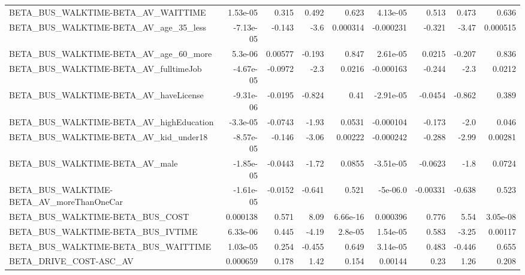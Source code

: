 \begin{tabular}{lrrrrrrrr}
BETA\_BUS\_WALKTIME-BETA\_AV\_WAITTIME                 &    1.53e-05 &        0.315 &    0.492 &    0.623 &   4.13e-05 &       0.513 &        0.473 &         0.636 \\
BETA\_BUS\_WALKTIME-BETA\_AV\_age\_35\_less              &   -7.13e-05 &       -0.143 &     -3.6 & 0.000314 &  -0.000231 &      -0.321 &        -3.47 &      0.000515 \\
BETA\_BUS\_WALKTIME-BETA\_AV\_age\_60\_more              &     5.3e-06 &      0.00577 &   -0.193 &    0.847 &   2.61e-05 &      0.0215 &       -0.207 &         0.836 \\
BETA\_BUS\_WALKTIME-BETA\_AV\_fulltimeJob              &   -4.67e-05 &      -0.0972 &     -2.3 &   0.0216 &  -0.000163 &      -0.244 &         -2.3 &        0.0212 \\
BETA\_BUS\_WALKTIME-BETA\_AV\_haveLicense              &   -9.31e-06 &      -0.0195 &   -0.824 &     0.41 &  -2.91e-05 &     -0.0454 &       -0.862 &         0.389 \\
BETA\_BUS\_WALKTIME-BETA\_AV\_highEducation            &    -3.3e-05 &      -0.0743 &    -1.93 &   0.0531 &  -0.000104 &      -0.173 &         -2.0 &         0.046 \\
BETA\_BUS\_WALKTIME-BETA\_AV\_kid\_under18              &   -8.57e-05 &       -0.146 &    -3.06 &  0.00222 &  -0.000242 &      -0.288 &        -2.99 &       0.00281 \\
BETA\_BUS\_WALKTIME-BETA\_AV\_male                     &   -1.85e-05 &      -0.0443 &    -1.72 &   0.0855 &  -3.51e-05 &     -0.0623 &         -1.8 &        0.0724 \\
BETA\_BUS\_WALKTIME-BETA\_AV\_moreThanOneCar           &   -1.61e-05 &      -0.0152 &   -0.641 &    0.521 &   -5e-06.0 &    -0.00331 &       -0.638 &         0.523 \\
BETA\_BUS\_WALKTIME-BETA\_BUS\_COST                    &    0.000138 &        0.571 &     8.09 & 6.66e-16 &   0.000396 &       0.776 &         5.54 &      3.05e-08 \\
BETA\_BUS\_WALKTIME-BETA\_BUS\_IVTIME                  &    6.33e-06 &        0.445 &    -4.19 &  2.8e-05 &   1.54e-05 &       0.583 &        -3.25 &       0.00117 \\
BETA\_BUS\_WALKTIME-BETA\_BUS\_WAITTIME                &    1.03e-05 &        0.254 &   -0.455 &    0.649 &   3.14e-05 &       0.483 &       -0.446 &         0.655 \\
BETA\_DRIVE\_COST-ASC\_AV                             &    0.000659 &        0.178 &     1.42 &    0.154 &    0.00144 &        0.23 &         1.26 &         0.208 \\

\end{tabular}
